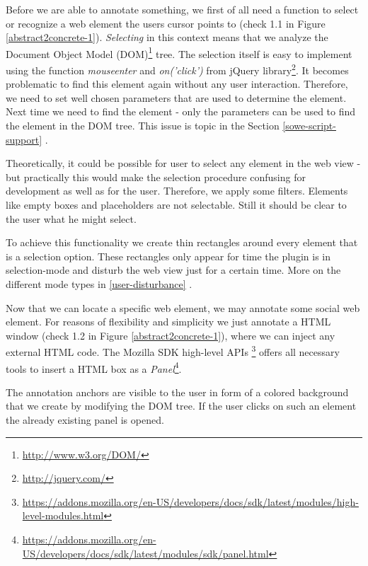 Before we are able to annotate something, we first of all need a function to select or recognize a web element the users cursor points to (check 1.1 in Figure \ref{abstract2concrete-1}). \emph{Selecting} in this context means that we analyze the Document Object Model (DOM)\footnote{\url{http://www.w3.org/DOM/}} tree. The selection itself is easy to implement using the function \emph{mouseenter} and \emph{on('click')} from jQuery library\footnote{\url{http://jquery.com/}}. It becomes problematic to find this element again without any user interaction. Therefore, we need to set well chosen parameters that are used to determine the element. Next time we need to find the element - only the parameters can be used to find the element in the DOM tree. This issue is topic in the Section \ref{sowe-script-support} .

Theoretically, it could be possible for user to select any element in the web view - but practically this would make the selection procedure confusing for development as well as for the user. Therefore, we apply some filters. Elements like empty boxes and placeholders are not selectable. 
Still it should be clear to the user what he might select. 

To achieve this functionality we create thin rectangles around every element that is a selection option. These rectangles only appear for time the plugin is in selection-mode and disturb the web view just for a certain time. More on the different mode types in \ref{user-disturbance}  .

Now that we can locate a specific web element, we may annotate some social web element. For reasons of flexibility and simplicity we just annotate a HTML window (check 1.2 in Figure \ref{abstract2concrete-1}), where we can inject any external HTML code. The Mozilla SDK high-level APIs \footnote{\url{https://addons.mozilla.org/en-US/developers/docs/sdk/latest/modules/high-level-modules.html}} offers all necessary tools to insert a HTML box as a \emph{Panel}\footnote{\url{https://addons.mozilla.org/en-US/developers/docs/sdk/latest/modules/sdk/panel.html}}.

The annotation anchors are visible to the user in form of a colored background that we create by modifying the DOM tree.
If the user clicks on such an element the already existing panel is opened. 

